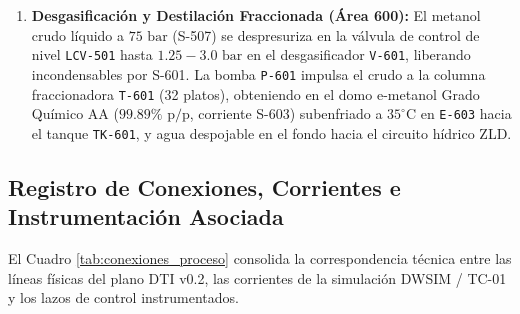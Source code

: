 \documentclass[10pt,letterpaper]{article}
\begin{document}
\begin{enumerate}[leftmargin=*]
    \item \textbf{Desgasificación y Destilación Fraccionada (Área 600):} El metanol crudo líquido a $75\text{ bar}$ (S-507) se despresuriza en la válvula de control de nivel \texttt{LCV-501} hasta $1.25-3.0\text{ bar}$ en el desgasificador \texttt{V-601}, liberando incondensables por S-601. La bomba \texttt{P-601} impulsa el crudo a la columna fraccionadora \texttt{T-601} (32 platos), obteniendo en el domo e-metanol Grado Químico AA ($99.89\%\text{ p/p}$, corriente S-603) subenfriado a $35^\circ\text{C}$ en \texttt{E-603} hacia el tanque \texttt{TK-601}, y agua despojable en el fondo hacia el circuito hídrico ZLD.
\end{enumerate}

\subsection{Registro de Conexiones, Corrientes e Instrumentación Asociada}
El Cuadro \ref{tab:conexiones_proceso} consolida la correspondencia técnica entre las líneas físicas del plano DTI v0.2, las corrientes de la simulación DWSIM / TC-01 y los lazos de control instrumentados.
\end{document}

